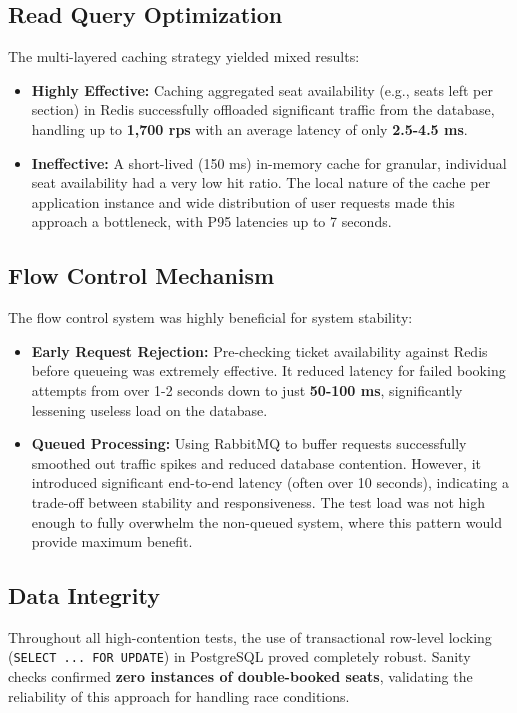 \documentclass[a0,landscape]{config/poster/a0poster}
\begin{document}
\begin{multicols}{4}
    \subsection*{Read Query Optimization}
    The multi-layered caching strategy yielded mixed results:
    \begin{itemize}
        \item \textbf{Highly Effective:} Caching aggregated seat availability (e.g., seats left per section) in Redis successfully offloaded significant traffic from the database, handling up to \textbf{1,700 rps} with an average latency of only \textbf{2.5-4.5 ms}.
        \item \textbf{Ineffective:} A short-lived (150 ms) in-memory cache for granular, individual seat availability had a very low hit ratio. The local nature of the cache per application instance and wide distribution of user requests made this approach a bottleneck, with P95 latencies up to 7 seconds.
    \end{itemize}

    \subsection*{Flow Control Mechanism}
    The flow control system was highly beneficial for system stability:
    \begin{itemize}
        \item \textbf{Early Request Rejection:} Pre-checking ticket availability against Redis before queueing was extremely effective. It reduced latency for failed booking attempts from over 1-2 seconds down to just \textbf{50-100 ms}, significantly lessening useless load on the database.
        \item \textbf{Queued Processing:} Using RabbitMQ to buffer requests successfully smoothed out traffic spikes and reduced database contention. However, it introduced significant end-to-end latency (often over 10 seconds), indicating a trade-off between stability and responsiveness. The test load was not high enough to fully overwhelm the non-queued system, where this pattern would provide maximum benefit.
    \end{itemize}

    \subsection*{Data Integrity}
    Throughout all high-contention tests, the use of transactional row-level locking (\texttt{SELECT ... FOR UPDATE}) in PostgreSQL proved completely robust. Sanity checks confirmed \textbf{zero instances of double-booked seats}, validating the reliability of this approach for handling race conditions.


\end{multicols}
\end{document}
